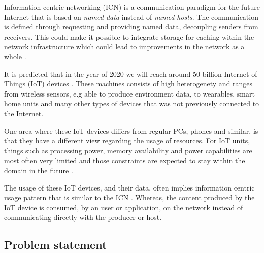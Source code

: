 Information-centric networking (ICN) is a communication paradigm for the future Internet that is based on \textit{named data} instead of \textit{named hosts}. The communication is defined through requesting and providing named data, decoupling senders from receivers. This could make it possible to integrate storage for caching within the network infrastructure which could lead to improvements in the network as a whole \cite{Ahlgren2012} .

It is predicted that in the year of 2020 we will reach around 50 billion Internet of Things (IoT) devices \cite{alanCarlton}. These machines consists of high heterogenety and ranges from wireless sensors, e.g able to produce environment data, to wearables, smart home units and many other types of devices that was not previously connected to the Internet.

One area where these IoT devices differs from regular PCs, phones and similar, is that they have a different view regarding the usage of resources. For IoT units, things such as processing power, memory availability and power capabilities are most often very limited and those constraints are expected to stay within the domain in the future \cite{chipmakersarebetting}.

The usage of these IoT devices, and their data, often implies information centric usage pattern that is similar to the ICN \cite{Ahlgreniot}. Whereas, the content produced by the IoT device is consumed, by an user or application, on the network instead of communicating directly with the producer or host.



\subsection{Problem statement}

